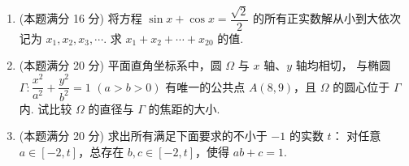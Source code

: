 \documentclass{chsmc}
\begin{document}
\begin{enumerate}[resume]
  \item (本题满分 16 分) 将方程 $\sin x + \cos x = \dfrac{\sqrt{2}}{2}$
    的所有正实数解从小到大依次记为 $x_1, x_2, x_3, \cdots$.
    求 $x_1 + x_2 + \cdots + x_{20}$ 的值.
  \item (本题满分 20 分) 平面直角坐标系中，圆 $\Omega$ 与 $x$ 轴、$y$ 轴均相切，
    与椭圆 $\Gamma\colon \dfrac{x^2}{a^2} + \dfrac{y^2}{b^2} = 1$
    $(a > b > 0)$ 有唯一的公共点 $A(8,9)$，且 $\Omega$ 的圆心位于 $\Gamma$ 内.
    试比较 $\Omega$ 的直径与 $\Gamma$ 的焦距的大小.
  \item (本题满分 20 分) 求出所有满足下面要求的不小于 $-1$ 的实数 $t$：
    对任意 $a \in [-2,t]$，总存在 $b, c \in [-2,t]$，使得 $ab + c = 1$.
\end{enumerate}
\end{document}

